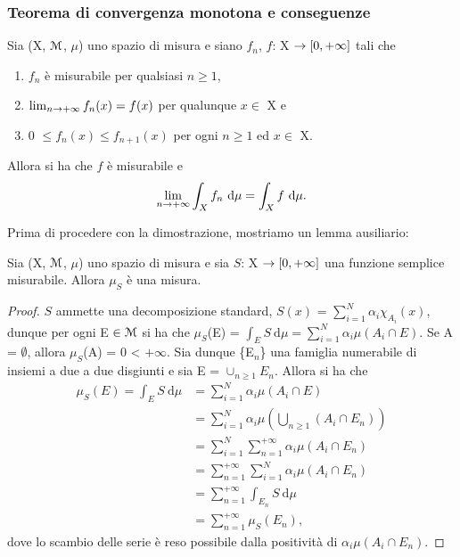 \documentclass[Completo.tex]{subfiles}
\begin{document}
	\subsubsection{Teorema di convergenza monotona e conseguenze}
	\begin{eTh}
		Sia (X, $\eu[M]$, $\mu$) uno spazio di misura e siano $f_n$, $f$: X $\rightarrow [0, +\infty]$ tali che
		\begin{enumerate}
			\item $f_n$ è misurabile per qualsiasi $n \geq 1$, 
			\item $\lim_{n \rightarrow +\infty} f_n(x) = f(x)$ per qualunque $x \in$ X e
			\item 0 $\leq f_n(x) \leq f_{n+1}(x)$ per ogni $n \geq 1$ ed $x \in$ X.
		\end{enumerate}
		Allora si ha che $f$ è misurabile e
		\begin{equation*}
		\lim_{n \rightarrow +\infty} \int_X f_n \ \mathrm{d}\mu = \int_X f \ \mathrm{d}\mu.
		\end{equation*}
	\end{eTh}
	Prima di procedere con la dimostrazione, mostriamo un lemma ausiliario:
	\begin{eTh}
		Sia (X, $\eu[M]$, $\mu$) uno spazio di misura e sia $S$: X $\rightarrow [0, +\infty]$ una funzione semplice misurabile. Allora $\mu_S$ è una misura.
	\end{eTh}
	\begin{proof}
		$S$ ammette una decomposizione standard, $S(x)$ = $\sum_{i = 1}^{N} \alpha_i \chi_{A_i}(x)$, dunque per ogni E $\in \eu[M]$ si ha che $\mu_S$(E) = $\int_E S \ \mathrm{d}\mu = \sum_{i = 1}^{N} \alpha_i \mu(A_i \cap E)$. Se A = $\emptyset$, allora $\mu_S$(A) = 0 < $+\infty$. Sia dunque \{E$_n$\} una famiglia numerabile di insiemi a due a due disgiunti e sia E = $\cup_{n\geq1} E_n$. Allora si ha che
		\begin{align*}
		\mu_S(E) = \int_E S \ \mathrm{d}\mu &= \sum_{i = 1}^{N} \alpha_i \mu(A_i \cap E) \\
		&= \sum_{i = 1}^{N} \alpha_i \mu\left(\bigcup_{n\geq1}(A_i \cap E_n)\right) \\
		&= \sum_{i = 1}^{N} \sum_{n=1}^{+\infty} \alpha_i \mu(A_i \cap E_n) \\
		&= \sum_{n=1}^{+\infty} \sum_{i=1}^{N} \alpha_i \mu(A_i \cap E_n) \\
		&= \sum_{n=1}^{+\infty} \int_{E_n} S \ \mathrm{d}\mu \\
		&= \sum_{n=1}^{+\infty} \mu_S(E_n),
		\end{align*}
		dove lo scambio delle serie è reso possibile dalla positività di $\alpha_i \mu(A_i \cap E_n)$.
	\end{proof}
\end{document}
